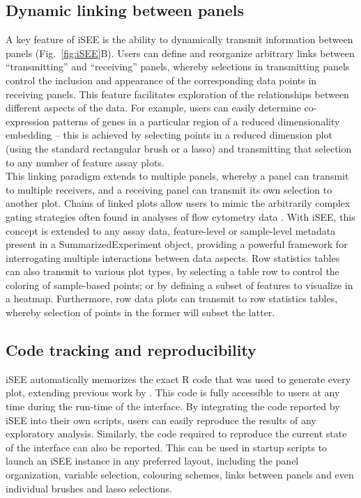 \documentclass[10pt,a4paper,twocolumn]{article}
\let\cite\citep
\begin{document}
\subsection*{Dynamic linking between panels}
A key feature of iSEE is the ability to dynamically transmit information between panels (Fig.~\ref{fig:iSEE}B).
Users can define and reorganize arbitrary links between ``transmitting'' and ``receiving'' panels, whereby selections in transmitting panels control the inclusion and appearance of the corresponding data points in receiving panels.
This feature facilitates exploration of the relationships between different aspects of the data.
For example, users can easily determine co-expression patterns of genes in a particular region of a reduced dimensionality embedding -- this is achieved by selecting points in a reduced dimension plot (using the standard rectangular brush or a lasso) and transmitting that selection to any number of feature assay plots.\\

This linking paradigm extends to multiple panels, whereby a panel can transmit to multiple receivers, and a receiving panel can transmit its own selection to another plot.
Chains of linked plots allow users to mimic the arbitrarily complex gating strategies often found in analyses of flow cytometry data \citep{finak2014opencyto}.
With iSEE, this concept is extended to any assay data, feature-level or sample-level metadata present in a SummarizedExperiment object, providing a powerful framework for interrogating multiple interactions between data aspects.
Row statistics tables can also transmit to various plot types, by selecting a table row to control the coloring of sample-based points;
or by defining a subset of features to visualize in a heatmap.
Furthermore, row data plots can transmit to row statistics tables, whereby selection of points in the former will subset the latter.

\subsection*{Code tracking and reproducibility}

iSEE automatically memorizes the exact R code that was used to generate every plot, extending previous work by \cite{marini2016interrepro}.
This code is fully accessible to users at any time during the run-time of the interface.
By integrating the code reported by iSEE into their own scripts, users can easily reproduce the results of any exploratory analysis.
Similarly, the code required to reproduce the current state of the interface can also be reported.
This can be used in startup scripts to launch an iSEE instance in any preferred layout, including the panel organization, variable selection, colouring schemes, links between panels and even individual brushes and lasso selections.
\end{document}
